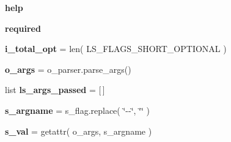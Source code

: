 \begin{DoxyCompactItemize}
\item 
{\bfseries help}\hypertarget{namespacenegui_1_1pgdriveneestimator_ad407ca10f30961eabc0630c21fe8da45}{}\label{namespacenegui_1_1pgdriveneestimator_ad407ca10f30961eabc0630c21fe8da45}

\item 
{\bfseries required}\hypertarget{namespacenegui_1_1pgdriveneestimator_ab5c3d005ba8659dc07a5f3171c7214df}{}\label{namespacenegui_1_1pgdriveneestimator_ab5c3d005ba8659dc07a5f3171c7214df}

\item 
{\bfseries i\+\_\+total\+\_\+opt} = len( L\+S\+\_\+\+F\+L\+A\+G\+S\+\_\+\+S\+H\+O\+R\+T\+\_\+\+O\+P\+T\+I\+O\+N\+AL )\hypertarget{namespacenegui_1_1pgdriveneestimator_a3c6b1b9d9500e05eca62433ac13c8692}{}\label{namespacenegui_1_1pgdriveneestimator_a3c6b1b9d9500e05eca62433ac13c8692}

\item 
{\bfseries o\+\_\+args} = o\+\_\+parser.\+parse\+\_\+args()\hypertarget{namespacenegui_1_1pgdriveneestimator_abff5b751b69197ab0c78f53cf34e3a05}{}\label{namespacenegui_1_1pgdriveneestimator_abff5b751b69197ab0c78f53cf34e3a05}

\item 
list {\bfseries ls\+\_\+args\+\_\+passed} = \mbox{[}$\,$\mbox{]}\hypertarget{namespacenegui_1_1pgdriveneestimator_af517e995e63706b0e5297adb3a372e43}{}\label{namespacenegui_1_1pgdriveneestimator_af517e995e63706b0e5297adb3a372e43}

\item 
{\bfseries s\+\_\+argname} = s\+\_\+flag.\+replace( \char`\"{}-\/-\/\char`\"{}, \char`\"{}\char`\"{} )\hypertarget{namespacenegui_1_1pgdriveneestimator_af8fac37bc1806ab9f054b8c4754e669e}{}\label{namespacenegui_1_1pgdriveneestimator_af8fac37bc1806ab9f054b8c4754e669e}

\item 
{\bfseries s\+\_\+val} = getattr( o\+\_\+args, s\+\_\+argname )\hypertarget{namespacenegui_1_1pgdriveneestimator_a801907b0dbfc713d2a817781f2b3c7d4}{}\label{namespacenegui_1_1pgdriveneestimator_a801907b0dbfc713d2a817781f2b3c7d4}

\end{DoxyCompactItemize}


